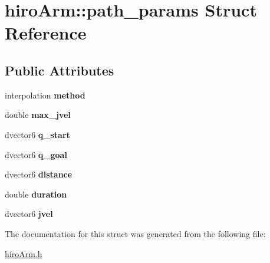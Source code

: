 \hypertarget{structhiroArm_1_1path__params}{\section{hiro\-Arm\-:\-:path\-\_\-params Struct Reference}
\label{structhiroArm_1_1path__params}
}
\subsection*{Public Attributes}
\begin{DoxyCompactItemize}
\item 
\hypertarget{structhiroArm_1_1path__params_a32faccf34e7ff3fdf7a1fd04b09473a3}{interpolation {\bfseries method}}\label{structhiroArm_1_1path__params_a32faccf34e7ff3fdf7a1fd04b09473a3}

\item 
\hypertarget{structhiroArm_1_1path__params_a5f0c5282fd7030b93d5e12c213868707}{double {\bfseries max\-\_\-jvel}}\label{structhiroArm_1_1path__params_a5f0c5282fd7030b93d5e12c213868707}

\item 
\hypertarget{structhiroArm_1_1path__params_aa4301fa0c840ebc0e486440309c0bd60}{dvector6 {\bfseries q\-\_\-start}}\label{structhiroArm_1_1path__params_aa4301fa0c840ebc0e486440309c0bd60}

\item 
\hypertarget{structhiroArm_1_1path__params_a1a5e3887d9e304fa72025371484dd21f}{dvector6 {\bfseries q\-\_\-goal}}\label{structhiroArm_1_1path__params_a1a5e3887d9e304fa72025371484dd21f}

\item 
\hypertarget{structhiroArm_1_1path__params_a0871678d0dd60e39dad49a3d130e56b8}{dvector6 {\bfseries distance}}\label{structhiroArm_1_1path__params_a0871678d0dd60e39dad49a3d130e56b8}

\item 
\hypertarget{structhiroArm_1_1path__params_af4ca58fa99d882f8d0fa5804360a0fce}{double {\bfseries duration}}\label{structhiroArm_1_1path__params_af4ca58fa99d882f8d0fa5804360a0fce}

\item 
\hypertarget{structhiroArm_1_1path__params_aedf0b1cb5a9cf6ee2bf21b961c44f354}{dvector6 {\bfseries jvel}}\label{structhiroArm_1_1path__params_aedf0b1cb5a9cf6ee2bf21b961c44f354}

\end{DoxyCompactItemize}


The documentation for this struct was generated from the following file\-:\begin{DoxyCompactItemize}
\item 
\hyperlink{hiroArm_8h}{hiro\-Arm.\-h}\end{DoxyCompactItemize}
